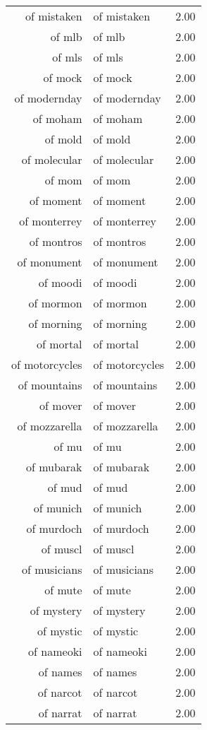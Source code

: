 \begin{table}[ht]
\begin{tabular}{rlr}
  of mistaken & of mistaken & 2.00 \\ 
  of mlb & of mlb & 2.00 \\ 
  of mls & of mls & 2.00 \\ 
  of mock & of mock & 2.00 \\ 
  of modernday & of modernday & 2.00 \\ 
  of moham & of moham & 2.00 \\ 
  of mold & of mold & 2.00 \\ 
  of molecular & of molecular & 2.00 \\ 
  of mom & of mom & 2.00 \\ 
  of moment & of moment & 2.00 \\ 
  of monterrey & of monterrey & 2.00 \\ 
  of montros & of montros & 2.00 \\ 
  of monument & of monument & 2.00 \\ 
  of moodi & of moodi & 2.00 \\ 
  of mormon & of mormon & 2.00 \\ 
  of morning & of morning & 2.00 \\ 
  of mortal & of mortal & 2.00 \\ 
  of motorcycles & of motorcycles & 2.00 \\ 
  of mountains & of mountains & 2.00 \\ 
  of mover & of mover & 2.00 \\ 
  of mozzarella & of mozzarella & 2.00 \\ 
  of mu & of mu & 2.00 \\ 
  of mubarak & of mubarak & 2.00 \\ 
  of mud & of mud & 2.00 \\ 
  of munich & of munich & 2.00 \\ 
  of murdoch & of murdoch & 2.00 \\ 
  of muscl & of muscl & 2.00 \\ 
  of musicians & of musicians & 2.00 \\ 
  of mute & of mute & 2.00 \\ 
  of mystery & of mystery & 2.00 \\ 
  of mystic & of mystic & 2.00 \\ 
  of nameoki & of nameoki & 2.00 \\ 
  of names & of names & 2.00 \\ 
  of narcot & of narcot & 2.00 \\ 
  of narrat & of narrat & 2.00 \\ 

\end{tabular}
\end{table}
